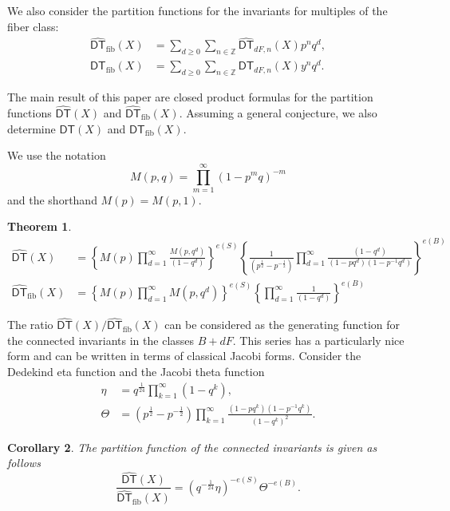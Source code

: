 \documentclass{amsart}
\newtheorem{theorem}{Theorem}%
\newtheorem{corollary}[theorem]{Corollary}
\theoremstyle{definition}
\newcommand{\ZZ} {\mathbb{Z}}		%
\newcommand{\DT}{\mathsf{DT}}
\newcommand{\DThat}{\widehat{\DT}}
\newcommand{\fiber}{\mathrm{fib}}
\newcommand{\half}{\frac{1}{2}}
\begin{document}
We also consider the partition functions for the invariants for
multiples of the fiber class:
\begin{align*}
\DThat_{\fiber}(X)& = \sum_{d\geq 0} \sum_{n \in \ZZ} \DThat_{dF,n}(X) p^{n} q^{d} ,\\
\DT_{\fiber}(X)& = \sum_{d\geq 0} \sum_{n \in \ZZ} \DT_{dF,n}(X) y^{n} q^{d} .
\end{align*}


The main result of this paper are closed product formulas for the
partition functions $\DThat (X)$ and $\DThat_{\fiber}(X)$. Assuming a
general conjecture, we also determine $\DT (X)$ and $\DT_{\fiber}(X)$.

We use the notation
\[
M(p,q) = \prod_{m=1}^{\infty} (1-p^{m}q)^{-m}
\]
and the shorthand $M(p)=M(p,1)$.

\begin{theorem}\label{thm: main thm -- formulas for DT and DTfiber}
\begin{align*}
\DThat (X) &= \left \{M(p)\prod_{d=1}^{\infty}
\frac{M(p,q^{d})}{(1-q^{d})} \right\}^{e(S)}
\left\{\frac{1}{(p^{\half}-p^{-\half})}\prod_{d=1}^{\infty}\frac{(1-q^{d})}{(1-pq^{d})(1-p^{-1}q^{d})}
\right\}^{e(B)} \\
\DThat_{\fiber}(X) &= \left\{M(p)\prod_{d=1}^{\infty}M(p,q^{d})
\right\}^{e(S)} \left\{\prod_{d=1}^{\infty}\frac{1}{(1-q^{d})}
\right\}^{e(B)}
\end{align*}
\end{theorem}


The ratio $\DThat (X)/\DThat_{\fiber}(X)$ can be considered as the
generating function for the connected invariants in the classes
$B+dF$. This series has a particularly nice form and can be written in
terms of classical Jacobi forms.  Consider the Dedekind eta function
and the Jacobi theta function
\begin{align*}
\eta &= q^{\frac{1}{24}} \prod_{k=1}^{\infty}(1-q^k), \\
\Theta &= 
(p^{\frac{1}{2}} - p^{-\frac{1}{2}}) \prod_{k=1}^{\infty} \frac{(1-p q^k) (1-p^{-1} q^k)}{(1-q^k)^2}.
\end{align*}

\begin{corollary} The partition function of the connected invariants is given as follows
\[
\frac{\DThat (X)}{\DThat_{\fiber}(X)}=
\left(q^{-\frac{1}{24}}\eta  \right)^{-e(S)}\Theta^{-e(B)}.
\]
\end{corollary}
\end{document}
